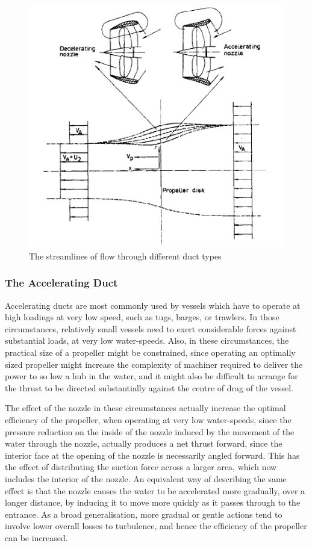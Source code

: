 \documentclass{article}\usepackage[]{graphicx}\usepackage[]{color}
\begin{document}
\begin{figure}
\includegraphics[width=\textwidth]{DuctStreamlines.png}
\caption{The streamlines of flow through different duct types \parencite[214]{lewis1988}}
\label{fig:DuctStreamlines.png}
\end{figure}

\subsubsection{The Accelerating Duct}
Accelerating ducts are most commonly used by vessels which have to operate at high loadings at very low speed, such as tugs, barges, or trawlers.  In those circumstances, relatively small vessels need to exert considerable forces against substantial loads, at very low water-speeds.  Also, in these circumstances, the practical size of a propeller might be constrained, since operating an optimally sized propeller might increase the complexity of machiner required to deliver the power to so low a hub in the water, and it might also be difficult to arrange for the thrust to be directed substantially against the centre of drag of the vessel.

The effect of the nozzle in these circumstances actually increase the optimal efficiency of the propeller, when operating at very low water-speeds, since the pressure reduction on the inside of the nozzle induced by the movement of the water through the nozzle, actually produces a net thrust forward, since the interior face at the opening of the nozzle is necessarily angled forward. This has the effect of distributing the suction force across a larger area, which now includes the interior of the nozzle.  An equivalent way of describing the same effect is that the nozzle causes the water to be accelerated more gradually, over a longer distance, by inducing it to move more quickly as it passes through to the entrance.  As a broad generalisation, more gradual or gentle actions tend to involve lower overall losses to turbulence, and hence the efficiency of the propeller can be increased.
\end{document}
